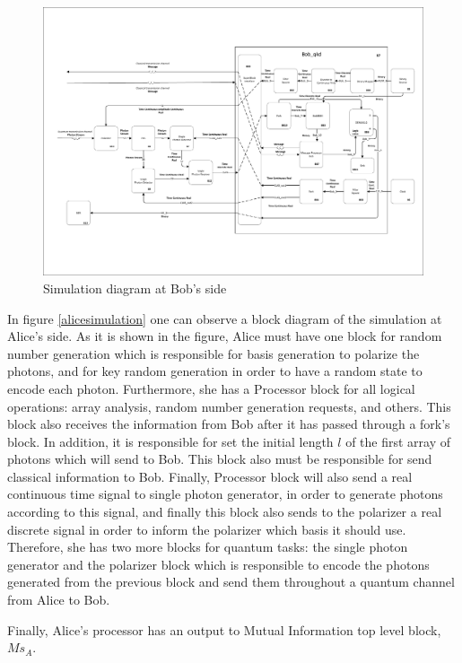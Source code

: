 \begin{figure}[h]
    \centering
        \includegraphics[clip, trim=0cm 0cm 0cm 0cm, width=1.00\textwidth]{./sdf/bb84_with_discrete_variables/figures_raw/Simulation_Bob_bb84.pdf}
    \caption{Simulation diagram at Bob's side}\label{bobsimulation}
\end{figure}

    In figure \ref{alicesimulation} one can observe a block diagram of the simulation at Alice's side. As it is shown in the figure, Alice must have one block for random number generation which is responsible for basis generation to polarize the photons, and for key random generation in order to have a random state to encode each photon. Furthermore, she has a Processor block for all logical operations: array analysis, random number generation requests, and others. This block also receives the information from Bob after it has passed through a fork's block. In addition, it is responsible for set the initial length $l$ of the first array of photons which will send to Bob. This block also must be responsible for send classical information to Bob. Finally, Processor block will also send a real continuous time signal to single photon generator, in order to generate photons according to this signal, and finally this block also sends to the polarizer a real discrete signal in order to inform the polarizer which basis it should use. Therefore, she has two more blocks for quantum tasks: the single photon generator and the polarizer block which is responsible to encode the photons generated from the previous block and send them throughout a quantum channel from Alice to Bob.

    Finally, Alice's processor has an output to Mutual Information top level block, $Ms_{A}$.

